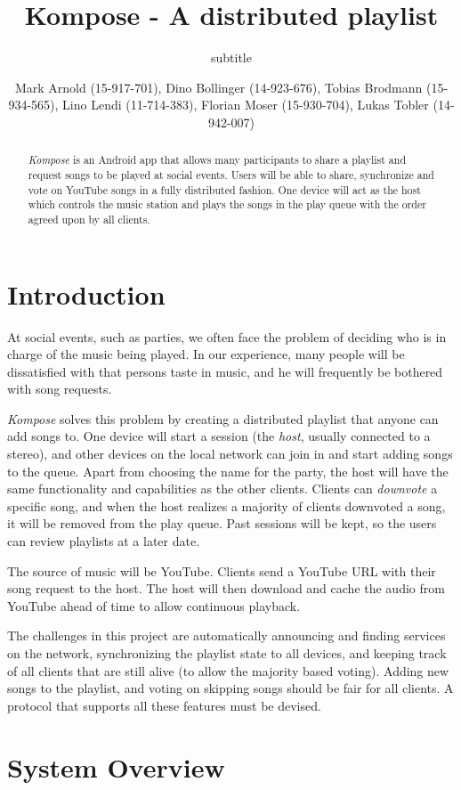 \documentclass{report}
\title{Kompose - A distributed playlist}
\subtitle{subtitle}
\author{
%
%
    \alignauthor \normalsize{Mark Arnold (15-917-701), Dino Bollinger (14-923-676), Tobias Brodmann (15-934-565), Lino Lendi (11-714-383), Florian Moser (15-930-704), Lukas Tobler (14-942-007)}\\
	\email{\normalsize{arnomark@student.ethz.ch, bdino@student.ethz.ch, brotobia@student.ethz.ch, llendi@student.ethz.ch, moserfl@studen.ethz.ch, lutobler@student.ethz.ch}}
}
\begin{document}
\maketitle

\begin{abstract}
\emph{Kompose} is an Android app that allows many participants to share a playlist and
request songs to be played at social events. Users will be able to share,
synchronize and vote on YouTube songs in a fully distributed fashion. One device will
act as the host which controls the music station and plays the songs in the play queue
with the order agreed upon by all clients.
\end{abstract}

\section{Introduction}
At social events, such as parties, we often face the problem of deciding who is
in charge of the music being played. In our experience, many people will be
dissatisfied with that persons taste in music, and he will frequently be
bothered with song requests.

\emph{Kompose} solves this problem by creating a distributed playlist that anyone
can add songs to. One device will start a session (the \emph{host}, usually connected
to a stereo), and other devices on the local network can join in and start
adding songs to the queue.  Apart from choosing the name for the party,
the host will have the same functionality and capabilities as the other clients.
Clients can \emph{downvote} a specific song, and when the host realizes
a majority of clients downvoted a song, it will be removed from the play queue.  
Past sessions will be kept, so the users can review playlists at a later date.

The source of music will be YouTube. Clients send a YouTube URL with
their song request to the host. The host will then download and cache the
audio from YouTube ahead of time to allow continuous playback.

The challenges in this project are automatically announcing and finding
services on the network, synchronizing the playlist state to all devices,
and keeping track of all clients that are still alive (to allow the majority based voting). 
Adding new songs to the playlist, and voting on skipping songs should be fair 
for all clients. A protocol that supports all these features must be devised.

\section{System Overview}
\end{document}
